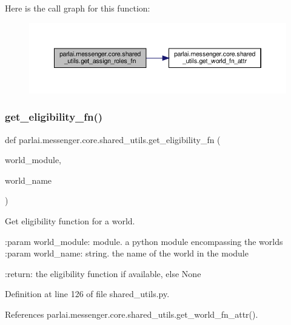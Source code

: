 Here is the call graph for this function\+:
\nopagebreak
\begin{figure}[H]
\begin{center}
\leavevmode
\includegraphics[width=350pt]{namespaceparlai_1_1messenger_1_1core_1_1shared__utils_ae5c062bdee92b3a18f187904e0ec8120_cgraph}
\end{center}
\end{figure}
\mbox{\label{namespaceparlai_1_1messenger_1_1core_1_1shared__utils_a4eab6934f22c919b9a02da591739c192}} 
\subsubsection{\texorpdfstring{get\+\_\+eligibility\+\_\+fn()}{get\_eligibility\_fn()}}
{\footnotesize\ttfamily def parlai.\+messenger.\+core.\+shared\+\_\+utils.\+get\+\_\+eligibility\+\_\+fn (\begin{DoxyParamCaption}\item[{}]{world\+\_\+module,  }\item[{}]{world\+\_\+name }\end{DoxyParamCaption})}

\begin{DoxyVerb}Get eligibility function for a world.

:param world_module:
    module. a python module encompassing the worlds
:param world_name:
    string. the name of the world in the module

:return:
    the eligibility function if available, else None
\end{DoxyVerb}
 

Definition at line 126 of file shared\+\_\+utils.\+py.



References parlai.\+messenger.\+core.\+shared\+\_\+utils.\+get\+\_\+world\+\_\+fn\+\_\+attr().

